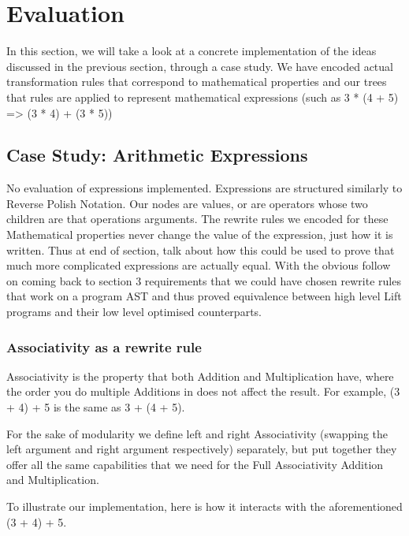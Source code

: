 \documentclass{l4proj}
\begin{document}
\chapter{Evaluation} \label{evaluation}

In this section, we will take a look at a concrete implementation of the ideas discussed in the previous section, through a case study. We have encoded actual transformation rules that correspond to mathematical properties and our trees that rules are applied to represent mathematical expressions (such as 3 * (4 + 5) => (3 * 4) + (3 * 5))


\section{Case Study: Arithmetic Expressions}

No evaluation of expressions implemented. 
Expressions are structured similarly to Reverse Polish Notation. Our nodes are values, or are operators whose two children are that operations arguments.
The rewrite rules we encoded for these Mathematical properties never change the value of the expression, just how it is written.
Thus at end of section, talk about how this could be used to prove that much more complicated expressions are actually equal. 
With the obvious follow on coming back to section 3 requirements that we could have chosen rewrite rules that work on a program AST and thus proved equivalence between high level Lift programs and their low level optimised counterparts.


\subsection{Associativity as a rewrite rule}

Associativity is the property that both Addition and Multiplication have, where the order you do multiple Additions in does not affect the result. For example, (3 + 4) + 5 is the same as 3 + (4 + 5).

For the sake of modularity we define left and right Associativity (swapping the left argument and right argument respectively) separately, but put together they offer all the same capabilities that we need for the Full Associativity Addition and Multiplication.


To illustrate our implementation, here is how it interacts with the aforementioned (3 + 4) + 5.
\end{document}
